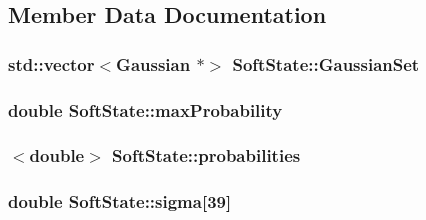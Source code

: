 \subsection{Member Data Documentation}
\hypertarget{class_soft_state_a5bb4abdc4477467c63accf9cb5699f55}{
\subsubsection[{Gaussian\+Set}]{\setlength{\rightskip}{0pt plus 5cm}std\+::vector$<${\bf Gaussian} $\ast$$>$ Soft\+State\+::\+Gaussian\+Set\hspace{0.3cm}{\ttfamily [private]}}}\label{class_soft_state_a5bb4abdc4477467c63accf9cb5699f55}
\hypertarget{class_soft_state_a5172fb3fe754e9599b47fb738023d7cc}{
\subsubsection[{max\+Probability}]{\setlength{\rightskip}{0pt plus 5cm}double Soft\+State\+::max\+Probability\hspace{0.3cm}{\ttfamily [private]}}}\label{class_soft_state_a5172fb3fe754e9599b47fb738023d7cc}
\hypertarget{class_soft_state_ac9dbfedcf51c0d3bf104d8d4b061f2ae}{
\subsubsection[{probabilities}]{$<$double$>$ Soft\+State\+::probabilities\hspace{0.3cm}{\ttfamily [private]}}}\label{class_soft_state_ac9dbfedcf51c0d3bf104d8d4b061f2ae}
\hypertarget{class_soft_state_a329aa0dcdc7c6d628014e5ad86566c52}{
\subsubsection[{sigma}]{\setlength{\rightskip}{0pt plus 5cm}double Soft\+State\+::sigma\mbox{[}39\mbox{]}\hspace{0.3cm}{\ttfamily [private]}}}\label{class_soft_state_a329aa0dcdc7c6d628014e5ad86566c52}
